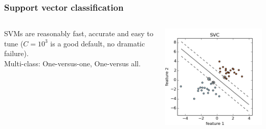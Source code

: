 \begin{frame}
\frametitle{Support vector classification}
\begin{columns}[c]
 SVMs are reasonably fast, accurate and easy to
tune ($C=10^3$ is a good default, no dramatic failure).\\ %

Multi-class: One-versus-one, One-versus all.

\par
\includegraphics[width=\textwidth]{sklearn_material/plot_separating_hyperplane_0011.png}
\end{columns}
\end{frame}

